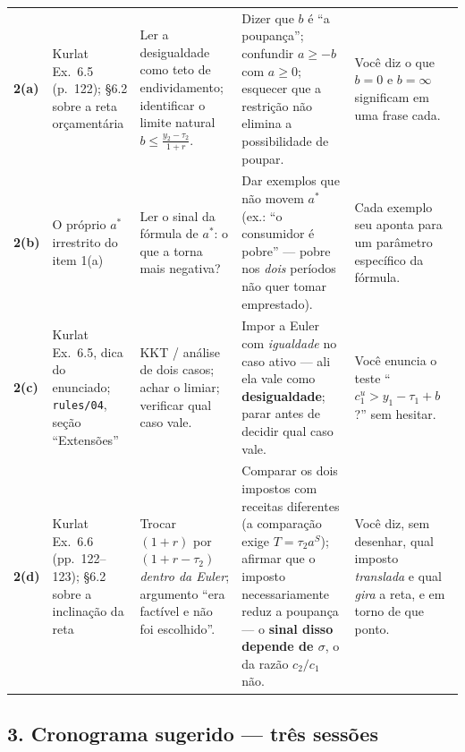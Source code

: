 \documentclass[11pt, a4paper]{article}
\newcommand{\stst}{^{\ast}}
\begin{document}
\begin{center}
\begin{tabular}{@{}p{0.9cm}p{3.0cm}p{4.0cm}p{4.0cm}p{3.4cm}@{}}
\textbf{2(a)} & Kurlat Ex.\ 6.5 (p.\ 122); §6.2 sobre a reta orçamentária
& Ler a desigualdade como teto de endividamento; identificar o limite natural
  $b\le\frac{y_2-\tau_2}{1+r}$.
& Dizer que $b$ é ``a poupança''; confundir $a\ge-b$ com $a\ge0$; esquecer que a
  restrição não elimina a possibilidade de poupar. & Você diz o que $b=0$ e
  $b=\infty$ significam em uma frase cada. \\

\textbf{2(b)} & O próprio $a\stst$ irrestrito do item 1(a)
& Ler o sinal da fórmula de $a\stst$: o que a torna mais negativa?
& Dar exemplos que não movem $a\stst$ (ex.: ``o consumidor é pobre'' --- pobre nos
  \emph{dois} períodos não quer tomar emprestado).
& Cada exemplo seu aponta para um parâmetro específico da fórmula. \\

\textbf{2(c)} & Kurlat Ex.\ 6.5, dica do enunciado; \texttt{rules/04}, seção ``Extensões''
& KKT / análise de dois casos; achar o limiar; verificar qual caso vale.
& Impor a Euler com \emph{igualdade} no caso ativo --- ali ela vale como
  \textbf{desigualdade}; parar antes de decidir qual caso vale.
& Você enuncia o teste ``$c_1^u>y_1-\tau_1+b$?'' sem hesitar. \\

\textbf{2(d)} & Kurlat Ex.\ 6.6 (pp.\ 122--123); §6.2 sobre a inclinação da reta
& Trocar $(1+r)$ por $(1+r-\tau_2)$ \emph{dentro da Euler}; argumento ``era factível e
  não foi escolhido''.
& Comparar os dois impostos com receitas diferentes (a comparação exige
  $T=\tau_2 a^S$); afirmar que o imposto necessariamente reduz a poupança --- o
  \textbf{sinal disso depende de $\sigma$}, o da razão $c_2/c_1$ não.
& Você diz, sem desenhar, qual imposto \emph{translada} e qual \emph{gira} a reta, e em
  torno de que ponto. \\
\bottomrule
\end{tabular}
\end{center}

\subsection*{3. Cronograma sugerido --- três sessões}
\end{document}
